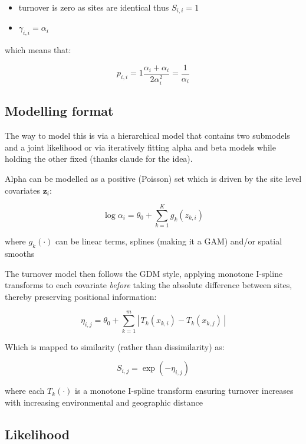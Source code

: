 \documentclass{article}
\begin{document}
\begin{itemize}
    \item turnover is zero as sites are identical thus $S_{i,i} = 1$
    \item $\gamma_{i,i} = \alpha_{i}$
\end{itemize}

which means that:

\begin{equation}
    p_{i,i} = 1 \frac{\alpha_{i} + \alpha_{i}}{2\alpha_{i}^{2}} = \frac{1}{\alpha_{i}}
\end{equation}

\subsection{Modelling format}

The way to model this is via a hierarchical model that contains two submodels and a joint likelihood or via iteratively fitting alpha and beta models while holding the other fixed (thanks claude for the idea). 

Alpha can be modelled as a positive (Poisson) set which is driven by the site level covariates $\textbf{z}_{i}$:

\begin{equation}
    \log \alpha_{i} = \theta_{0} + \sum_{k=1}^{K}g_{k}(z_{k,i})
\end{equation}

where $g_{k}(\cdot)$ can be linear terms, splines (making it a GAM) and/or spatial smooths

The turnover model then follows the GDM style, applying monotone I-spline transforms to each covariate \emph{before} taking the absolute difference between sites, thereby preserving positional information:

\begin{equation}
    \eta_{i,j} = \theta_{0} + \sum_{k=1}^{m}\left|\, T_k(x_{k,i}) - T_k(x_{k,j}) \,\right|
\end{equation}


Which is mapped to similarity (rather than dissimilarity) as:

\begin{equation}
    S_{i,j} = \exp(-\eta_{i,j})
\end{equation}

where each $T_k(\cdot)$ is a monotone I-spline transform ensuring turnover increases with increasing environmental and geographic distance 

\subsection{Likelihood}
\end{document}
